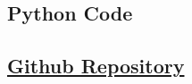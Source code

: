 \subsection{Python Code}
\subsection{\href{https://github.com/ynnickw/seminar-ws23.git}{Github Repository}}